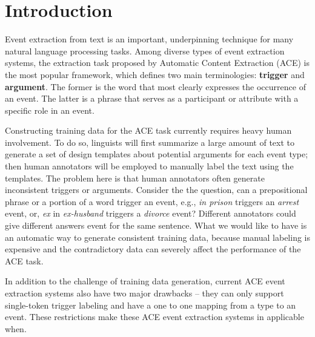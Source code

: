 \section{Introduction}
Event extraction from text is an important, underpinning technique for many natural language processing tasks.
Among diverse types of event extraction systems, the extraction task proposed by Automatic Content Extraction (ACE)
\cite{doddington2004automatic} is the most popular framework, which defines two main terminologies: \textbf{trigger}
and \textbf{argument}. The former is the word that most clearly expresses the occurrence of an event. The latter is a
phrase that serves as a participant or attribute with a specific role in an event.

Constructing training data for the ACE task currently requires heavy human involvement. To do so, linguists will first
summarize a large amount of text to generate a set of design templates about potential arguments for each event type;
then human annotators will be employed to manually label the text using the templates. The problem here is that human
annotators often generate inconsistent triggers or arguments. Consider the the question, can a prepositional phrase or
a portion of a word trigger an event, e.g., \textit{in prison} triggers an \emph{arrest} event, or, \textit{ex} in
\textit{ex-husband} triggers a \emph{divorce} event? Different annotators could give different answers event for the
same sentence. What we would like to have is an automatic way to generate consistent training data, because manual labeling is
expensive and
the contradictory data can severely affect the performance of the ACE task.

In addition to the challenge of training data generation, current ACE event extraction systems
also have two major drawbacks -- they can only support single-token trigger labeling and have
a one to one mapping from a type to an event. These restrictions make these ACE event extraction
systems in applicable when. 



